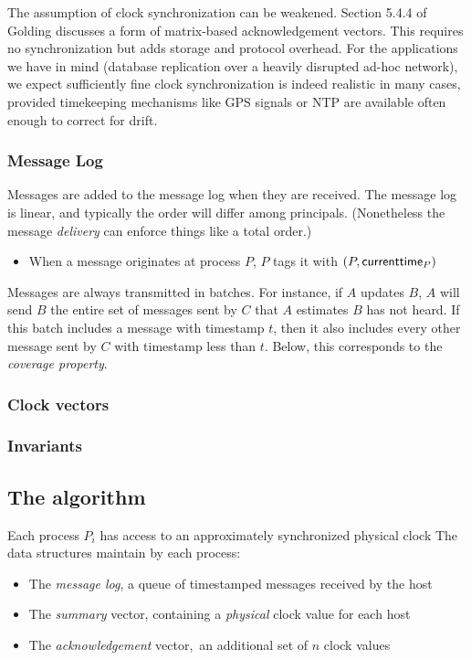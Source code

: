 \documentclass[]             %
{NASA}                       %
\theoremstyle{definition}
\begin{document}
The assumption of clock synchronization can be weakened. Section 5.4.4
of Golding \citationneeded discusses a form of matrix-based
acknowledgement vectors. This requires no synchronization but adds
storage and protocol overhead. For the applications we have in mind
(database replication over a heavily disrupted ad-hoc network), we
expect sufficiently fine clock synchronization is indeed realistic in
many cases, provided timekeeping mechanisms like GPS signals or NTP
are available often enough to correct for drift.

\subsubsection{Message Log}

Messages are added to the message log when they are received. The
message log is linear, and typically the order will differ among
principals. (Nonetheless the message \emph{delivery} can enforce
things like a total order.)

\begin{itemize}
\item When a message originates at process $P$, $P$ tags it with $(P, \textsf{currenttime}_{P})$
\end{itemize}

Messages are always transmitted in batches. For instance, if $A$
updates $B$, $A$ will send $B$ the entire set of messages sent by $C$
that $A$ estimates $B$ has not heard. If this batch includes a message
with timestamp $t$, then it also includes every other message sent by
$C$ with timestamp less than $t$. Below, this corresponds to the
\emph{coverage property}.

\subsubsection{Clock vectors}

\subsubsection{Invariants}

\subsection{The algorithm}

Each process $P_i$ has access to an approximately synchronized physical clock
The data structures maintain by each process:

\begin{itemize}
\item The \emph{message log}, a queue of timestamped messages received by the host
\item The \emph{summary} vector, containing a \emph{physical} clock value for each host
\item The \emph{acknowledgement} vector,\ an additional set of $n$ clock values
\end{itemize}
\end{document}
